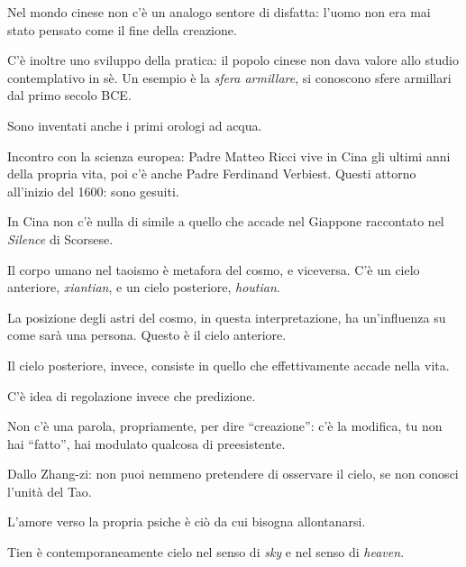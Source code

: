 \documentclass[main.tex]{subfiles}
\begin{document}
Nel mondo cinese non c'è un analogo sentore di disfatta: l'uomo non era mai stato pensato come il fine della creazione. 

C'è inoltre uno sviluppo della pratica: il popolo cinese non dava valore allo studio contemplativo in sè.
Un esempio è la \emph{sfera armillare}, si conoscono sfere armillari dal primo secolo BCE.

Sono inventati anche i primi orologi ad acqua. 

Incontro con la scienza europea: Padre Matteo Ricci vive in Cina gli ultimi anni della propria vita, poi c'è anche Padre Ferdinand Verbiest.
Questi attorno all'inizio del 1600: sono gesuiti. 

In Cina non c'è nulla di simile a quello che accade nel Giappone raccontato nel \emph{Silence} di Scorsese. 

Il corpo umano nel taoismo è metafora del cosmo, e viceversa. C'è un cielo anteriore, \emph{xiantian}, e un cielo posteriore, \emph{houtian}.

La posizione degli astri del cosmo, in questa interpretazione, ha un'influenza su come sarà una persona. Questo è il cielo anteriore.

Il cielo posteriore, invece, consiste in quello che effettivamente accade nella vita. 

C'è idea di regolazione invece che predizione. 

Non c'è una parola, propriamente, per dire ``creazione'': c'è la modifica, tu non hai ``fatto'', hai modulato qualcosa di preesistente. 

Dallo Zhang-zi: non puoi nemmeno pretendere di osservare il cielo, se non conosci l'unità del Tao. 

L'amore verso la propria psiche è ciò da cui bisogna allontanarsi.

Tien è contemporaneamente cielo nel senso di \emph{sky} e nel senso di \emph{heaven}. 
\end{document}
